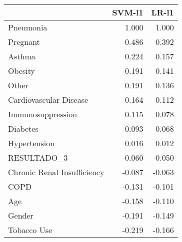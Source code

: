\begin{tabular}{lrr}
\toprule
{} &  SVM-l1 &  LR-l1 \\
\midrule
Pneumonia                   &   1.000 &  1.000 \\
Pregnant                    &   0.486 &  0.392 \\
Asthma                      &   0.224 &  0.157 \\
Obesity                     &   0.191 &  0.141 \\
Other                       &   0.191 &  0.136 \\
Cardiovascular Disease      &   0.164 &  0.112 \\
Immunosuppression           &   0.115 &  0.078 \\
Diabetes                    &   0.093 &  0.068 \\
Hypertension                &   0.016 &  0.012 \\
RESULTADO\_3                 &  -0.060 & -0.050 \\
Chronic Renal Insufficiency &  -0.087 & -0.063 \\
COPD                        &  -0.131 & -0.101 \\
Age                         &  -0.158 & -0.110 \\
Gender                      &  -0.191 & -0.149 \\
Tobacco Use                 &  -0.219 & -0.166 \\
\bottomrule
\end{tabular}
